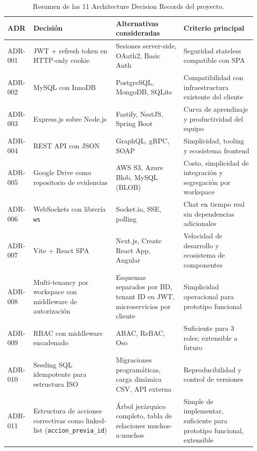 \documentclass[final]{udpthesis}
\begin{document}
\begin{table}[H]
\centering
\scriptsize
\begin{tabularx}{\textwidth}{|L{1.25cm}|Y|Y|Y|}
\hline
{}\textbf{ADR} & \textbf{Decisión} & \textbf{Alternativas consideradas} & \textbf{Criterio principal} \\ \hline
ADR-001 & JWT + refresh token en HTTP-only cookie & Sesiones server-side, OAuth2, Basic Auth & Seguridad stateless compatible con SPA \\ \hline
ADR-002 & MySQL con InnoDB & PostgreSQL, MongoDB, SQLite & Compatibilidad con infraestructura existente del cliente \\ \hline
ADR-003 & Express.js sobre Node.js & Fastify, NestJS, Spring Boot & Curva de aprendizaje y productividad del equipo \\ \hline
ADR-004 & REST API con JSON & GraphQL, gRPC, SOAP & Simplicidad, tooling y ecosistema frontend \\ \hline
ADR-005 & Google Drive como repositorio de evidencias & AWS S3, Azure Blob, MySQL (BLOB) & Costo, simplicidad de integración y segregación por workspace \\ \hline
ADR-006 & WebSockets con librería \texttt{ws} & Socket.io, SSE, polling & Chat en tiempo real sin dependencias adicionales \\ \hline
ADR-007 & Vite + React SPA & Next.js, Create React App, Angular & Velocidad de desarrollo y ecosistema de componentes \\ \hline
ADR-008 & Multi-tenancy por workspace con middleware de autorización & Esquemas separados por BD, tenant ID en JWT, microservicios por cliente & Simplicidad operacional para prototipo funcional \\ \hline
ADR-009 & RBAC con middleware encadenado & ABAC, ReBAC, Oso & Suficiente para 3 roles; extensible a futuro \\ \hline
ADR-010 & Seeding SQL idempotente para estructura ISO & Migraciones programáticas, carga dinámica CSV, API externa & Reproducibilidad y control de versiones \\ \hline
ADR-011 & Estructura de acciones correctivas como linked-list (\texttt{accion\_previa\_id}) & Árbol jerárquico completo, tabla de relaciones muchos-a-muchos & Simple de implementar, suficiente para prototipo funcional, extensible \\ \hline
\end{tabularx}
\normalsize
\caption{Resumen de las 11 Architecture Decision Records del proyecto.}
\label{tab:adr}
\end{table}
\end{document}
